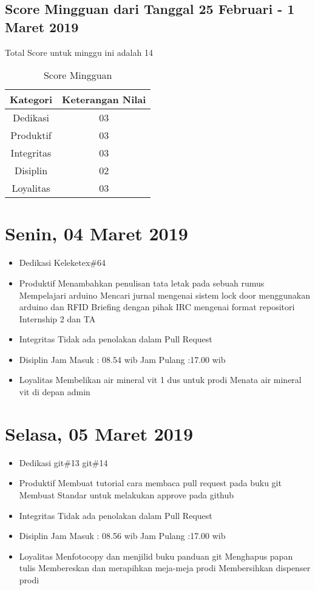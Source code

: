 \subsection{Score Mingguan dari Tanggal 25 Februari - 1 Maret 2019}
Total Score untuk minggu ini adalah 14

\begin{table}[h]
\caption{Score Mingguan}
\centering
\begin{tabular}{|c|c|}
\hline
\textbf{Kategori}&\textbf{Keterangan Nilai}\\
\hline
Dedikasi&03\\
\hline
Produktif&03\\
\hline
Integritas&03\\
\hline
Disiplin&02\\
\hline
Loyalitas&03\\
\hline
\end{tabular}
\label{table:score mingguan}
\end{table}

\section{Senin, 04 Maret 2019}
\begin{itemize}
\item Dedikasi
\subitem Keleketex\#64
\item Produktif
  \subitem Menambahkan penulisan tata letak pada sebuah rumus
  \subitem Mempelajari arduino
  \subitem Mencari jurnal mengenai sistem lock door menggunakan arduino dan RFID 
  \subitem Briefing dengan pihak IRC mengenai format repositori Internship 2 dan TA
\item Integritas
  \subitem Tidak ada penolakan dalam Pull Request
\item Disiplin
  \subitem Jam Masuk : 08.54 wib
  \subitem Jam Pulang :17.00 wib
\item Loyalitas
  \subitem Membelikan air mineral vit 1 dus untuk prodi
  \subitem Menata air mineral vit di depan admin
\end{itemize}

\section{Selasa, 05 Maret 2019}
\begin{itemize}
\item Dedikasi
\subitem git\#13
\subitem git\#14
\item Produktif
  \subitem Membuat tutorial cara membaca pull request pada buku git
  \subitem Membuat Standar untuk melakukan approve pada github
\item Integritas
  \subitem Tidak ada penolakan dalam Pull Request
\item Disiplin
  \subitem Jam Masuk : 08.56 wib
  \subitem Jam Pulang :17.00 wib
\item Loyalitas
  \subitem Menfotocopy dan menjilid buku panduan git 
  \subitem Menghapus papan tulis
  \subitem Membereskan dan merapihkan meja-meja prodi
  \subitem Membersihkan dispenser prodi 
\end{itemize}

